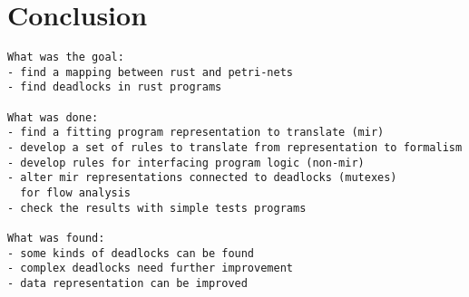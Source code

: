 \chapter{Conclusion}
\label{conclusion}
\begin{verbatim}
What was the goal:
- find a mapping between rust and petri-nets
- find deadlocks in rust programs

What was done:
- find a fitting program representation to translate (mir)
- develop a set of rules to translate from representation to formalism
- develop rules for interfacing program logic (non-mir)
- alter mir representations connected to deadlocks (mutexes) 
  for flow analysis
- check the results with simple tests programs

What was found:
- some kinds of deadlocks can be found
- complex deadlocks need further improvement
- data representation can be improved
\end{verbatim}





